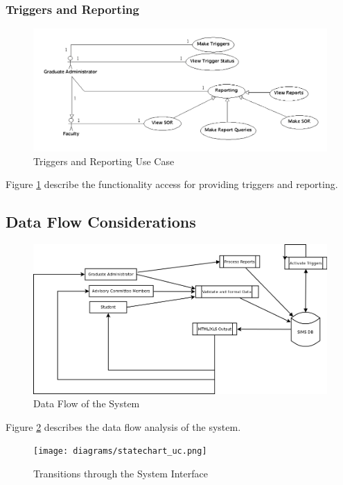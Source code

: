 \documentclass[11pt,a4paper]{report}
\begin{document}
\subsubsection{Triggers and Reporting}
\begin{figure}[htp]
\centering
\includegraphics[scale=0.5]{diagrams/use_cases/triggers_uc.png}
\caption{Triggers and Reporting Use Case}
\label{fig:Triggers}
\end{figure}

Figure \ref{fig:Triggers} describe the functionality access for providing triggers and reporting. 

\subsection{ Data Flow Considerations }

\begin{figure}[htp]
\centering
\includegraphics[scale=0.5]{diagrams/data_flow/dataflowdiagram.png}
\caption{Data Flow of the System}
\label{fig:DataFlow}
\end{figure}

Figure \ref{fig:DataFlow} describes the data flow analysis of the system. 

\begin{figure}[htp]                                                             
\centering                                                                      
\texttt{[image: diagrams/statechart\_uc.png]}
\caption{Transitions through the System Interface}                              
\label{fig:Transitions}   
\end{figure}                                                                    
             
\end{document}
